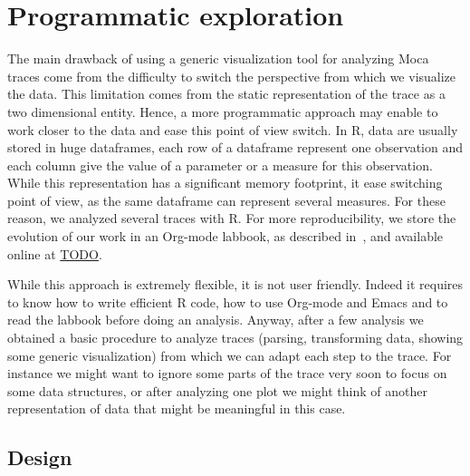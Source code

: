 \section{Programmatic exploration}
\label{sec:visu-second}

The main drawback of using a generic visualization tool for analyzing \gls{Moca} traces come from the difficulty to switch the perspective from which we visualize the data.
This limitation comes from the static representation of the trace as a two dimensional entity.
Hence, a more programmatic approach may enable to work closer to the data and ease this point of view switch.
In \gls{R}, data are usually stored in huge dataframes, each row of a dataframe represent one observation and each column give the value of a parameter or a measure for this observation.
While this representation has a significant memory footprint, it ease switching point of view, as the same dataframe can represent several measures.
For these reason, we analyzed several traces with \gls{R}.
For more reproducibility, we store the evolution of our work in an \gls{Org-mode} labbook, as described in~\cite[Chapter~4, p~54]{Stanisic15Reproducible}, and available online at \url{TODO}.

While this approach is extremely flexible, it is not user friendly.
Indeed it requires to know how to write efficient \gls{R} code, how to use \gls{Org-mode} and Emacs and to read the labbook before doing an analysis.
Anyway, after a few analysis we obtained a basic procedure to analyze traces (parsing, transforming data, showing some generic visualization) from which we can adapt each step to the trace.
For instance we might want to ignore some parts of the trace very soon to focus on some data structures, or after analyzing one plot we might think of another representation of data that might be meaningful in this case.

\subsection{Design}

